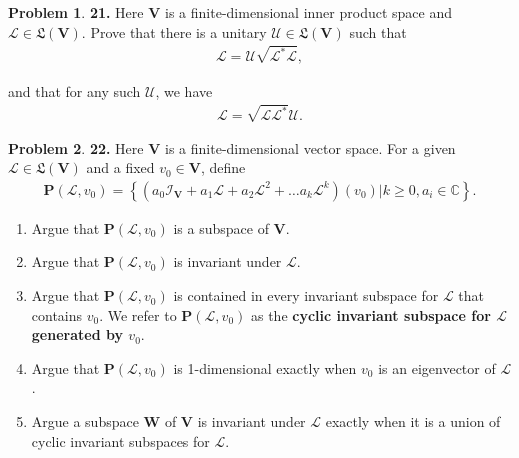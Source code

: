 \documentclass{article}
\theoremstyle{definition}
\newtheorem*{prob*}{Problem}
\newcommand{\Uni}{\mathcal{U}}
\newcommand{\V}{\mathbf{V}}
\newcommand{\W}{\mathbf{W}}
\newcommand{\lag}{\mathcal{L}}
\newcommand{\LL}{\mathfrak{L}}
\newcommand{\lp}{\left(}
\newcommand{\rp}{\right)}
\newcommand{\id}{\mathcal{I}}
\begin{document}
\newpage



\begin{prob*}\textbf{21.} Here $\V$ is a finite-dimensional inner product space and $\lag \in \LL(\V)$. Prove that there is a unitary $\Uni \in \LL(\V)$ such that
	\begin{align*}
	\lag = \Uni\sqrt{\lag^*\lag},
	\end{align*}
	
	and that for any such $\Uni$, we have
	\begin{align*}
	\lag = \sqrt{\lag\lag^*} \Uni.
	\end{align*}
	
\end{prob*}




\newpage



\begin{prob*}\textbf{22.} Here $\V$ is a finite-dimensional vector space. For a given $\lag \in \LL(\V)$ and a fixed $v_0 \in \V$, define
	\begin{align*}
	\mathbf{P}(\lag,v_0) = \left\{ \lp a_0 \id_\V + a_1 \lag + a_2 \lag^2 + \dots a_k \lag^k \rp(v_0) \bigg\vert   k \geq 0, a_i \in \mathbb{C}  \right\}.
	\end{align*}
	
	\begin{enumerate}
		\item Argue that $\mathbf{P}(\lag,v_0)$ is a subspace of $\V$.
		\item Argue that $\mathbf{P}(\lag,v_0)$ is invariant under $\lag$.
		\item Argue that $\mathbf{P}(\lag,v_0)$ is contained in every invariant subspace for $\lag$ that contains $v_0$. We refer to $\mathbf{P}(\lag,v_0)$ as the \textbf{cyclic invariant subspace for $\lag$ generated by $v_0$}.
		\item Argue that $\mathbf{P}(\lag,v_0)$ is 1-dimensional exactly when $v_0$ is an eigenvector of $\lag$.
		\item Argue a subspace $\W$ of $\V$ is invariant under $\lag$ exactly when it is a union of cyclic invariant subspaces for $\lag$.
	\end{enumerate}
	
\end{prob*}






\newpage
\end{document}
